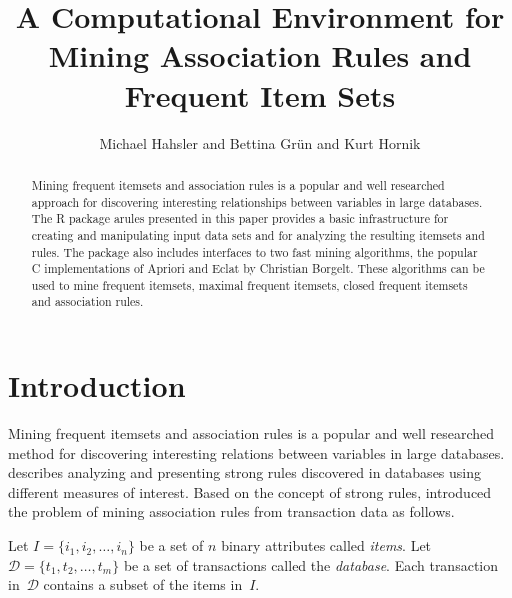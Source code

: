 \documentclass[10pt,a4paper]{article}
\newcommand{\strong}[1]{{\normalfont\fontseries{b}\selectfont #1}}
\newcommand{\pkg}[1]{\strong{#1}}
\newcommand{\proglang}[1]{\textsf{#1}}
\begin{document}
\title{A Computational Environment for Mining Association Rules and
  Frequent Item Sets}
\author{Michael Hahsler and Bettina Gr{\"u}n and Kurt Hornik}
\maketitle
\sloppy
\begin{abstract}
  Mining frequent itemsets and association rules is a popular and well
  researched approach for discovering interesting relationships between
  variables in large databases.  The \proglang{R} package \pkg{arules}
  presented in this paper provides a basic infrastructure for creating
  and manipulating input data sets and for analyzing the resulting
  itemsets and rules.  The package also includes interfaces to two fast
  mining algorithms, the popular \proglang{C} implementations of Apriori
  and Eclat by Christian Borgelt.  These algorithms can be used to mine
  frequent itemsets, maximal frequent itemsets, closed frequent itemsets
  and association rules.
\end{abstract}


\section{Introduction}

Mining frequent itemsets and association rules is a popular and well
researched method for discovering interesting relations between
variables in large databases. \cite{arules:Piatetsky-Shapiro:1991}
describes analyzing and presenting strong rules discovered in databases
using different measures of interest.  Based on the concept of strong
rules, \cite{arules:Agrawal+Imielinski+Swami:1993} introduced the
problem of mining association rules from transaction data as follows.

Let $I=\{i_1, i_2,\ldots,i_n\}$ be a set of $n$ binary attributes called
\emph{items}.  Let $\mathcal{D} = \{t_1, t_2, \ldots, t_m\}$ be a set of
transactions called the \emph{database}.  Each transaction
in~$\mathcal{D}$ contains a subset of the items in~$I$.
\end{document}
